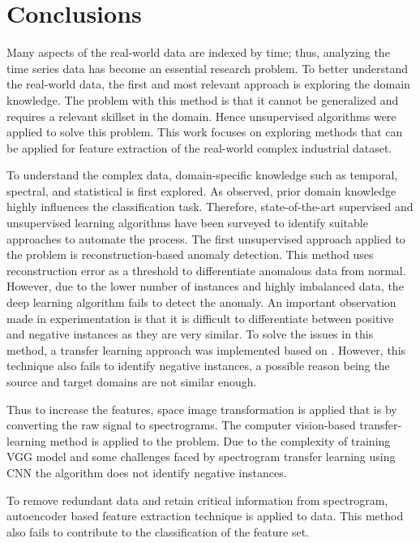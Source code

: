 

	\chapter{Conclusions}
	Many aspects of the real-world data are indexed by time; thus, analyzing the time series data has become an essential research problem. To better understand the real-world data, the first and most relevant approach is exploring the domain knowledge. The problem with this method is that it cannot be generalized and requires a relevant skillset in the domain. Hence unsupervised algorithms were applied to solve this problem. This work focuses on exploring methods that can be applied for feature extraction of the real-world complex industrial dataset.
	
	To understand the complex data, domain-specific knowledge such as temporal, spectral, and statistical is first explored. As observed, prior domain knowledge highly influences the classification task. Therefore, state-of-the-art supervised and unsupervised learning algorithms have been surveyed to identify suitable approaches to automate the process. The first unsupervised approach applied to the problem is reconstruction-based anomaly detection. This method uses reconstruction error as a threshold to differentiate anomalous data from normal. However, due to the lower number of instances and highly imbalanced data, the deep learning algorithm fails to detect the anomaly. An important observation made in experimentation is that it is difficult to differentiate between positive and negative instances as they are very similar. 
	To solve the issues in this method, a transfer learning approach was implemented based on \cite{fawaz2018transfer}. However, this technique also fails to identify negative instances, a possible reason being the source and target domains are not similar enough.
	
	Thus to increase the features, space image transformation is applied that is by converting the raw signal to spectrograms. The computer vision-based transfer-learning method is applied to the problem. Due to the complexity of training VGG model and some challenges faced by spectrogram transfer learning using CNN the algorithm does not identify negative instances.
	
	To remove redundant data and retain critical information from spectrogram, autoencoder based feature extraction technique is applied to data. This method also fails to contribute to the classification of the feature set.
	
